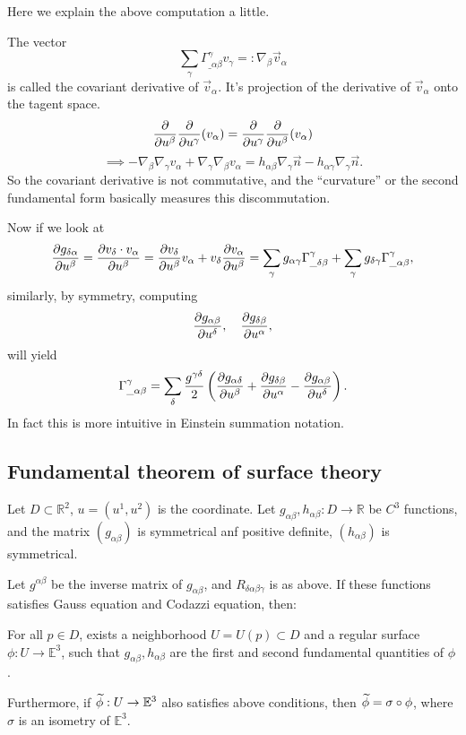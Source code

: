 Here we explain the above computation a little.

The vector
\[
\sum_{\gamma} \Gamma^\gamma_{\_\alpha\beta}v_\gamma
=: \nabla_\beta \vec{v}_\alpha
\]
is called the covariant derivative of $\vec{v}_\alpha$.
It's projection of the derivative of $\vec{v}_\alpha$ onto
the tagent space.
\[
\frac{\partial }{\partial u^\beta}\frac{\partial }{\partial u^\gamma}(v_\alpha)
= \frac{\partial }{\partial u^\gamma}\frac{\partial }{\partial u^\beta}(v_\alpha)
\]
\[
\implies -\nabla_\beta\nabla_\gamma v_\alpha + \nabla_\gamma\nabla_\beta
v_\alpha = h_{\alpha\beta}\nabla_\gamma \vec{n} - h_{\alpha\gamma}
\nabla_\gamma \vec{n}.
\]
So the covariant derivative is not commutative,
and the ``curvature'' or the second
fundamental form basically measures this discommutation.

Now if we look at
\[
\frac{\partial g_{\delta\alpha}}{\partial u^\beta} = \frac{\partial v_\delta\cdot v_\alpha}{\partial u^\beta}
= \frac{\partial v_\delta}{\partial u^\beta}v_\alpha + v_\delta \frac{\partial v_\alpha}{\partial u^\beta}
= \sum_{\gamma}g_{\alpha\gamma}\Gamma^\gamma_{\_\delta\beta}
+ \sum_{\gamma} g_{\delta\gamma}\Gamma^\gamma_{\_\alpha\beta},
\]
similarly, by symmetry, computing
\[
\frac{\partial g_{\alpha\beta}}{\partial u^\delta}, \quad \frac{\partial g_{\delta\beta}}{\partial u^\alpha},
\]
will yield
\[
\Gamma^\gamma_{\_\alpha\beta} = \sum_{\delta} \frac{g^{\gamma\delta}}{2}
\left(\frac{\partial g_{\alpha\delta}}{\partial u^\beta} + \frac{\partial g_{\delta\beta}}{\partial u^\alpha}
- \frac{\partial g_{\alpha\beta}}{\partial u^\delta}\right).
\]
In fact this is more intuitive in Einstein summation notation.

\subsection{Fundamental theorem of surface theory}
\label{sub:Fundamental theorem of surface theory}

\begin{theorem}
    Let $D \subset \mathbb{R}^2$, $u=(u^1,u^2)$ is the coordinate.
	Let $g_{\alpha\beta}, h_{\alpha\beta}: D\to \mathbb{R}$ be
	$C^3$ functions, and the matrix $(g_{\alpha\beta})$
	is symmetrical anf positive definite,
	$(h_{\alpha\beta})$ is symmetrical.

	Let $g^{\alpha\beta}$ be the inverse matrix of $g_{\alpha\beta}$,
	and $R_{\delta\alpha\beta\gamma}$ is as above.
	If these functions satisfies Gauss equation and Codazzi equation,
	then:

	For all $p\in D$, exists a neighborhood $U = U(p) \subset D$ and
	a regular surface $\phi: U\to \mathbb{E}^3$, such that
	$g_{\alpha\beta}, h_{\alpha\beta}$ are the first and second
	fundamental quantities of $\phi$.

	Furthermore, if $\widetilde{\phi}: U\to \mathbb{E}^3$ also
	satisfies above conditions, then $\widetilde{\phi} = \sigma\circ \phi$,
	where $\sigma$ is an isometry of $\mathbb{E}^3$.
\end{theorem}

